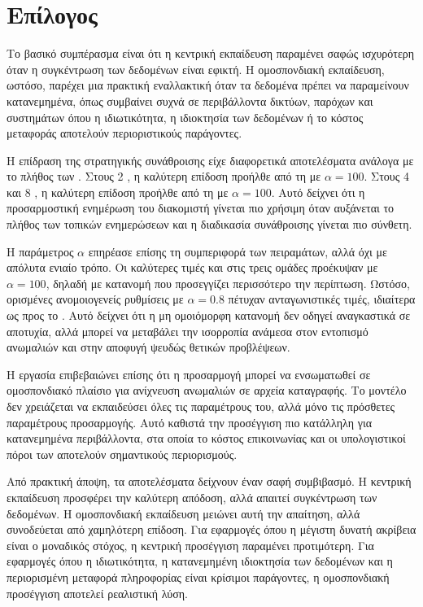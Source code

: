 \chapter{Επίλογος}

Το βασικό συμπέρασμα είναι ότι η κεντρική εκπαίδευση παραμένει σαφώς ισχυρότερη όταν η συγκέντρωση των δεδομένων είναι εφικτή. Η ομοσπονδιακή εκπαίδευση, ωστόσο, παρέχει μια πρακτική εναλλακτική όταν τα δεδομένα πρέπει να παραμείνουν κατανεμημένα, όπως συμβαίνει συχνά σε περιβάλλοντα δικτύων, παρόχων και συστημάτων όπου η ιδιωτικότητα, η ιδιοκτησία των δεδομένων ή το κόστος μεταφοράς αποτελούν περιοριστικούς παράγοντες.


Η επίδραση της στρατηγικής συνάθροισης είχε διαφορετικά αποτελέσματα ανάλογα με το πλήθος των . Στους 2 , η καλύτερη επίδοση προήλθε από τη  με \(\alpha=100\). Στους 4 και 8 , η καλύτερη επίδοση προήλθε από τη  με \(\alpha=100\). Αυτό δείχνει ότι η προσαρμοστική ενημέρωση του διακομιστή γίνεται πιο χρήσιμη όταν αυξάνεται το πλήθος των τοπικών ενημερώσεων και η διαδικασία συνάθροισης γίνεται πιο σύνθετη.

Η παράμετρος \(\alpha\) επηρέασε επίσης τη συμπεριφορά των πειραμάτων, αλλά όχι με απόλυτα ενιαίο τρόπο. Οι καλύτερες τιμές  και στις τρεις ομάδες  προέκυψαν με \(\alpha=100\), δηλαδή με κατανομή που προσεγγίζει περισσότερο την  περίπτωση. Ωστόσο, ορισμένες ανομοιογενείς ρυθμίσεις με \(\alpha=0.8\) πέτυχαν ανταγωνιστικές τιμές, ιδιαίτερα ως προς το . Αυτό δείχνει ότι η μη ομοιόμορφη κατανομή δεν οδηγεί αναγκαστικά σε αποτυχία, αλλά μπορεί να μεταβάλει την ισορροπία ανάμεσα στον εντοπισμό ανωμαλιών και στην αποφυγή ψευδώς θετικών προβλέψεων.

Η εργασία επιβεβαιώνει επίσης ότι η προσαρμογή  μπορεί να ενσωματωθεί σε ομοσπονδιακό πλαίσιο για ανίχνευση ανωμαλιών σε αρχεία καταγραφής. Το μοντέλο δεν χρειάζεται να εκπαιδεύσει όλες τις παραμέτρους του, αλλά μόνο τις πρόσθετες παραμέτρους προσαρμογής. Αυτό καθιστά την προσέγγιση πιο κατάλληλη για κατανεμημένα περιβάλλοντα, στα οποία το κόστος επικοινωνίας και οι υπολογιστικοί πόροι των  αποτελούν σημαντικούς περιορισμούς.

Από πρακτική άποψη, τα αποτελέσματα δείχνουν έναν σαφή συμβιβασμό. Η κεντρική εκπαίδευση προσφέρει την καλύτερη απόδοση, αλλά απαιτεί συγκέντρωση των δεδομένων. Η ομοσπονδιακή εκπαίδευση μειώνει αυτή την απαίτηση, αλλά συνοδεύεται από χαμηλότερη επίδοση. Για εφαρμογές όπου η μέγιστη δυνατή ακρίβεια είναι ο μοναδικός στόχος, η κεντρική προσέγγιση παραμένει προτιμότερη. Για εφαρμογές όπου η ιδιωτικότητα, η κατανεμημένη ιδιοκτησία των δεδομένων και η περιορισμένη μεταφορά πληροφορίας είναι κρίσιμοι παράγοντες, η ομοσπονδιακή προσέγγιση αποτελεί ρεαλιστική λύση.
